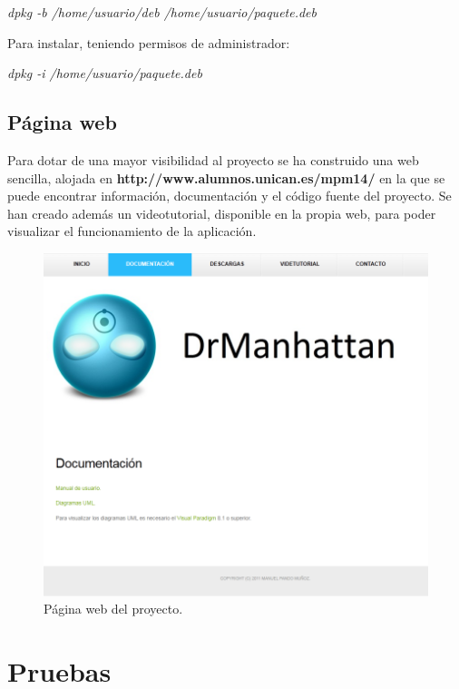 \begin{center}
    \emph{dpkg -b /home/usuario/deb /home/usuario/paquete.deb}
\end{center}

Para instalar, teniendo permisos de administrador:

\begin{center}
    \emph{dpkg -i /home/usuario/paquete.deb}
\end{center}


\subsection{Página web}

Para dotar de una mayor visibilidad al proyecto se ha construido una web sencilla, alojada en {\bfseries http://www.alumnos.unican.es/mpm14/} en la que se puede encontrar información, documentación y el código fuente del proyecto. Se han creado además un videotutorial, disponible en la propia web, para poder visualizar el funcionamiento de la aplicación.

\begin{figure}
    \centering
    \includegraphics[width=.90\linewidth]{implementacion/web}
    \caption{Página web del proyecto.}
    \label{fig:implementacion:web}
\end{figure}





\section{Pruebas}
\label{sec:despliegue:pruebas}

